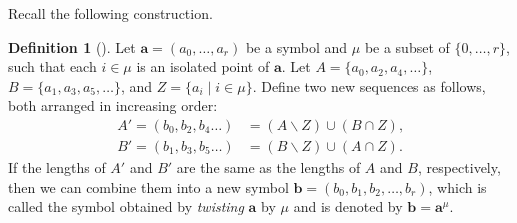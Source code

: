 \documentclass{amsart}
\theoremstyle{definition}
\newtheorem{definition}[theorem]{Definition}
\newcommand{\Z}{\mathbb{Z}}
\newcommand{\ba}{\mathbf{a}}
\newcommand{\bb}{\mathbf{b}}
\newcommand{\0}{\mathcal{O}}
\begin{document}

Recall the following construction.

\begin{definition}[{\cite[Definition 3.5]{Achar-Sage-special}}]
	Let $\ba = (a_0, \ldots, a_r)$ be a symbol %
	and 
	$\mu$ be a subset of $\{0, \ldots, r\}$, such that each $i \in \mu$ is an isolated point of $\ba$.  Let $A =
	\{a_0, a_2, a_4, \ldots\}$, $B = \{a_1, a_3, a_5, \ldots\}$, and $Z =
	\{a_i \mid i \in \mu\}$.  Define two new sequences as follows, both arranged in increasing
	order:
	\begin{align*}
		A' = (b_0, b_2, b_4 \ldots) &=
		\text{$(A \smallsetminus Z) \cup (B \cap Z)$,} \\
		B' = (b_1, b_3, b_5 \ldots) &=
		\text{$(B \smallsetminus Z) \cup (A \cap Z)$.}
	\end{align*}
	If the lengths of $A'$ and $B'$ are the same as the lengths of $A$ and
	$B$, respectively, then we can combine them into a new symbol
	$\bb = (b_0, b_1, b_2, \ldots, b_r)$, which is called the symbol obtained by \emph{twisting} $\ba$ by $\mu$ and is denoted by $\bb = \ba^\mu$.
\end{definition}
\end{document}
